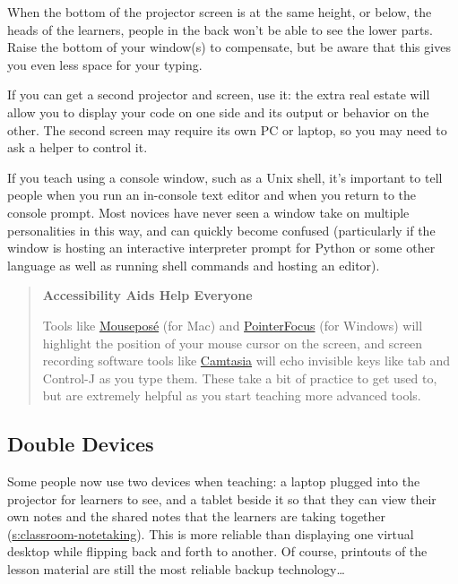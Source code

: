 When the bottom of the projector screen is at the same height, or below,
the heads of the learners, people in the back won't be able to see the
lower parts. Raise the bottom of your window(s) to compensate, but be
aware that this gives you even less space for your typing.

If you can get a second projector and screen, use it: the extra real
estate will allow you to display your code on one side and its output or
behavior on the other. The second screen may require its own PC or
laptop, so you may need to ask a helper to control it.

If you teach using a console window, such as a Unix shell, it's
important to tell people when you run an in-console text editor and when
you return to the console prompt. Most novices have never seen a window
take on multiple personalities in this way, and can quickly become
confused (particularly if the window is hosting an interactive
interpreter prompt for Python or some other language as well as running
shell commands and hosting an editor).

\begin{quote}\setlength{\parindent}{0pt}
\textbf{Accessibility Aids Help Everyone}

Tools like \href{https://boinx.com/mousepose/overview/}{Mouseposé} (for Mac) and
\href{http://www.pointerfocus.com/}{PointerFocus} (for Windows) will highlight the
position of your mouse cursor on the screen, and screen recording
software tools like \href{https://www.techsmith.com/video-editor.html}{Camtasia} will echo invisible keys
like tab and Control-J as you type them. These take a bit of
practice to get used to, but are extremely helpful as you start
teaching more advanced tools.
\end{quote}

\subsection{Double Devices}\label{double-devices}

Some people now use two devices when teaching: a laptop plugged into the
projector for learners to see, and a tablet beside it so that they can
view their own notes and the shared notes that the learners are taking
together (\protect\hyperlink{SECTION}{s:classroom-notetaking}). This is more reliable
than displaying one virtual desktop while flipping back and forth to
another. Of course, printouts of the lesson material are still the most
reliable backup technology\ldots{}

